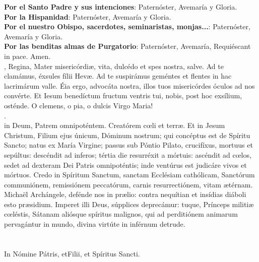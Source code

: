 \documentclass[9pt]{article}
\begin{document}
\begin{multicols*}{2}
    \textbf{Por el Santo Padre y sus intenciones}: Paternóster, Avemaría y Gloria.\\
    \textbf{Por la Hispanidad}: Paternóster, Avemaría y Gloria.\\
    \textbf{Por el nuestro Obispo, sacerdotes, seminaristas, monjas...}: Paternóster, Avemaría y Gloria.\\
    \textbf{Por las benditas almas de Purgatorio}: Paternóster, Avemaría, Requiéscant in pace. Amen. \\

    , Regina, Mater misericórdi{\ae}, vita, dulcédo et spes nostra, salve. Ad te clamámus, éxsules fílii Hev{\ae}.
    Ad te suspirámus geméntes et flentes in hac lacrimárum valle. Éia ergo, advocáta nostra, illos tuos misericórdes óculos ad nos convérte.
    Et Iesum benedíctum fructum ventris tui, nobis, post hoc exsílium, osténde. O clemens, o pia, o dulcis Virgo Maria!\\
    \orapronobissalveinline.\\

     in Deum, Patrem omnipoténtem. Creatórem c{\oe}li et terræ. Et in Jesum Christum, Filium ejus únicum, Dóminum nostrum;
    qui concéptus est de Spíritu Sancto; natus ex María Virgine; passus sub Póntio Pilato, crucifíxus, mortuus et sepúltus:
    descéndit ad inferos; tértia die resurréxit a mórtuis: ascéndit ad c{\oe}los, sedet ad dexteram Dei Patris omnipoténtis;
    inde ventúrus est judicáre vivos et mórtuos. Credo in Spíritum Sanctum, sanctam Ecclésiam cathólicam, Sanctórum communiónem,
    remissiónem peccatórum, carnis resurrectiónem, vitam {\ae}térnam.\\

     Michaël Archángele, defénde nos in pr{\ae}lio: contra nequítian et insídias diáboli esto pr{\ae}sidium. Imperet illi Deus, 
    súpplices deprecámur: tuque, Prínceps militi{\ae} c{\oe}léstis, Sátanam aliósque spíritus malignos, qui ad perditiónem animarum pervagántur in mundo,
    divina virtúte in inférnum detrude. \\

    \\
    
    \\

    In Nómine Pátris, et{\redcross}Filii, et Spíritus Sancti.

\end{multicols*}
\end{document}
